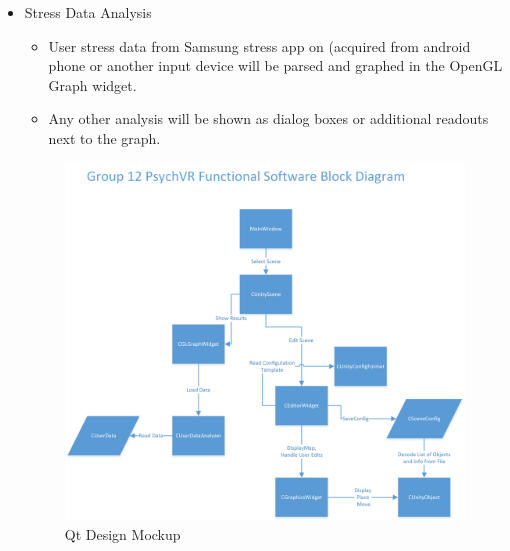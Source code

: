 \documentclass[a4paper,10pt]{article}
\begin{document}
\begin{itemize}
\begin{itemize}
\end{itemize}
\item Stress Data Analysis
\begin{itemize}
\item User stress data from Samsung stress app on (acquired from android phone or another input device will be parsed and graphed in the OpenGL Graph widget.
\item Any other analysis will be shown as dialog boxes or additional readouts next to the graph.
\end{itemize}
\begin{figure}[H]
					\includegraphics[width=\linewidth,height=\paperheight,keepaspectratio]{qtConfig.png}
					\caption{Qt Design Mockup}
					\label{fig:qtMockup}
				\end{figure}
\end{itemize}
\end{document}
